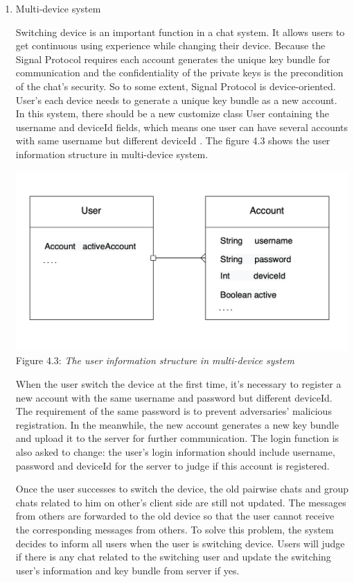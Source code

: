 \begin{enumerate}[label=(\roman*)]
\item Multi-device system

Switching device is an important function in a chat system. It allows users to get continuous using experience while changing their device. Because the Signal Protocol requires each account generates the unique key bundle for communication and the confidentiality of the private keys is the precondition of the chat's security. So to some extent, Signal Protocol is device-oriented. User's each device needs to generate a unique key bundle as a new account. In this system, there should be a new customize class User containing the username and deviceId fields, which means one user can have several accounts with same username but different deviceId \citep{MultiDevice}. The figure 4.3 shows the user information structure in multi-device system.

\begin{center}
\includegraphics[scale=.5]{../4-Implementation/resources/Figure4-3.png}\\
Figure 4.3: \textit{The user information structure in multi-device system}
\end{center}

When the user switch the device at the first time, it's necessary to register a new account with the same username and password but different deviceId. The requirement of the same password is to prevent adversaries' malicious registration. In the meanwhile, the new account generates a new key bundle and upload it to the server for further communication. The login function is also asked to change: the user's login information should include username, password and deviceId for the server to judge if this account is registered.

Once the user successes to switch the device, the old pairwise chats and group chats related to him on other's client side are still not updated. The messages from others are forwarded to the old device so that the user cannot receive the corresponding messages from others. To solve this problem, the system decides to inform all users when the user is switching device. Users will judge if there is any chat related to the switching user and update the switching user's information and key bundle from server if yes.


\end{enumerate}
